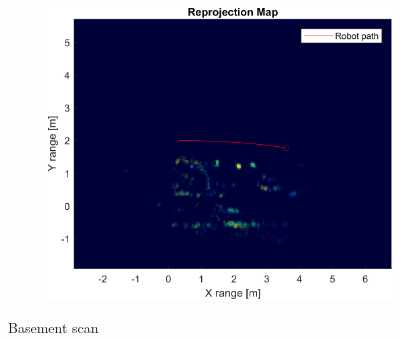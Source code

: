 \begin{figure}[htbp]
\begin{subfigure}[t]{0.475\linewidth}
    \end{subfigure}\bigskip\\
    \begin{subfigure}[t]{0.5\linewidth}
        \centering
        \includegraphics[width=\linewidth,max height=.475\textheight]{gfx/results/basement_reprojection.png}
    \end{subfigure}%
    \caption{Basement scan}
\end{figure}

